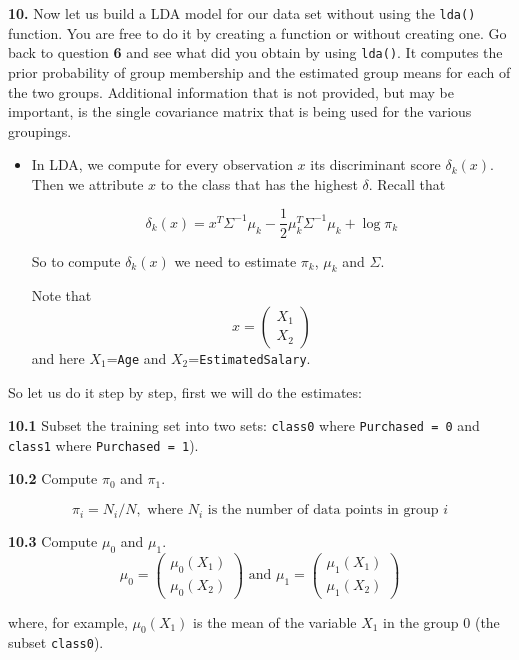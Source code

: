 \documentclass[]{book}
\newenvironment{rmdblock}[1]
  {\begin{shaded*}
  \begin{itemize}
  \renewcommand{\labelitemi}{
    \raisebox{-.7\height}[0pt][0pt]{
      {\setkeys{Gin}{width=2em,keepaspectratio}\texttt{[image: img/icons/\#1]}}
    }
  }
  \item
  }
  {
  \end{itemize}
  \end{shaded*}
  }
\newenvironment{rmdinsight}
  {\begin{rmdblock}{insight}}
  {\end{rmdblock}}
\begin{document}
\textbf{10.} Now let us build a LDA model for our data set without using
the \texttt{lda()} function. You are free to do it by creating a
function or without creating one. Go back to question \textbf{6} and see
what did you obtain by using \texttt{lda()}. It computes the prior
probability of group membership and the estimated group means for each
of the two groups. Additional information that is not provided, but may
be important, is the single covariance matrix that is being used for the
various groupings.

\begin{rmdinsight}
In LDA, we compute for every observation \(x\) its discriminant score
\(\delta_k(x)\). Then we attribute \(x\) to the class that has the
highest \(\delta\). Recall that

\[\delta_k(x) = x^T \Sigma^{-1} \mu_k - \frac{1}{2} \mu_k^T \Sigma^{-1}  \mu_k + \log \pi_k\]

So to compute \(\delta_k(x)\) we need to estimate \(\pi_k\), \(\mu_k\)
and \(\Sigma\).

Note that \[x=\begin{pmatrix}
            X_1 \\
            X_2
            \end{pmatrix}\] and here \(X_1\)=\texttt{Age} and
\(X_2\)=\texttt{EstimatedSalary}.
\end{rmdinsight}

So let us do it step by step, first we will do the estimates:

\textbf{10.1} Subset the training set into two sets: \texttt{class0}
where \texttt{Purchased\ =\ 0} and \texttt{class1} where
\texttt{Purchased\ =\ 1}).

\textbf{10.2} Compute \(\pi_0\) and \(\pi_1\).

\[\pi_i = N_i / N, \,\, \text{where} \,\, N_i \,\, \text{is the number of data points in group } i\]

\textbf{10.3} Compute \(\mu_0\) and \(\mu_1\). \[\mu_0 = \begin{pmatrix}
   \mu_0(X_1) \\
   \mu_0(X_2)
   \end{pmatrix} \,\, \text{and} \,\, \mu_1 = \begin{pmatrix}
   \mu_1(X_1) \\
   \mu_1(X_2)
   \end{pmatrix}\]

where, for example, \(\mu_0(X_1)\) is the mean of the variable \(X_1\)
in the group \(0\) (the subset \texttt{class0}).
\end{document}
